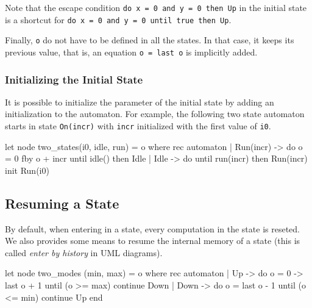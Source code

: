 \documentclass[11pt,titlepage,twoside]{report}
\begin{document}

Note that the escape condition \verb-do x = 0 and y = 0 then Up- in
the initial state is a shortcut for
\verb-do x = 0 and y = 0 until true then Up-.

Finally, \verb-o- do not have to be defined in all the states. In that
case, it keeps its previous value, that is, an equation
\verb-o = last o- is implicitly added.

\subsubsection{Initializing the Initial State\label{initinitstate}}

It is possible to initialize the parameter of the initial state by adding
an initialization to the automaton. For example, the following two state 
automaton
starts in state \texttt{On(incr)} with \texttt{incr} initialized with the first
value of \texttt{i0}.
\begin{chklisting}[withresult]
let node two_states(i0, idle, run) = o where
  rec automaton
      | Run(incr) -> do o = 0 fby o + incr until idle() then Idle
      | Idle -> do until run(incr) then Run(incr)
      init Run(i0)
\end{chklisting}

\subsection{Resuming a State\label{resume}} %

By default, when entering in a state, every computation in the state
is reseted. We also provides some means to resume the internal memory
of a state (this is called {\em enter by history} in UML diagrams).
\begin{chklisting}[include=updownmodes]
let node two_modes (min, max) = o where
  rec automaton
      | Up -> do o = 0 -> last o + 1 until (o >= max) continue Down
      | Down -> do o = last o - 1 until (o <= min) continue Up
      end
\end{chklisting}
\end{document}
